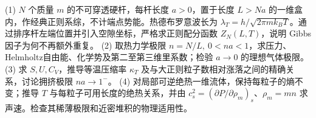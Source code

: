 (1) \(N\) 个质量 \(m\) 的不可穿透硬杆，每杆长度 \(a>0\)，置于长度 \(L>Na\) 的一维盒内，作经典正则系综，不计端点势能。热德布罗意波长为 \(\lambda_T=h/\sqrt{2\pi mk_BT}\)。通过排序杆左端位置并引入空隙坐标，严格求正则配分函数 \(Z_N(L,T)\)，说明 Gibbs 因子为何不再额外重复。
(2) 取热力学极限 \(n=N/L,\ 0<na<1\)，求压力、Helmholtz自由能、化学势及第二至第三维里系数；检验 \(a\to0\) 的理想气体极限。
(3) 求 \(S,U,C_V\)，推导等温压缩率 \(\kappa_T\) 及与大正则粒子数相对涨落之间的精确关系，讨论拥挤极限 \(na\to1^-\)。
(4) 对局部可逆绝热一维流体，保持每粒子的熵不变；推导 \(T\) 与每粒子可用长度的绝热关系，并由 \(c_s^2=(\partial P/\partial\rho_m)_s\)、\(\rho_m=mn\) 求声速。检查其稀薄极限和近密堆积的物理适用性。
